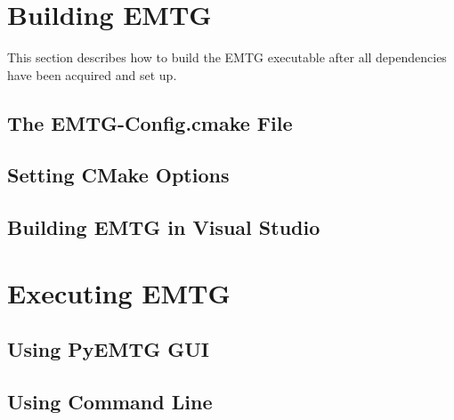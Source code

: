 \documentclass[11pt]{article}
\begin{document}







\section{Building EMTG}
\label{sec:building_emtg}

This section describes how to build the \ac{EMTG} executable after all dependencies have been acquired and set up. 

\subsection{The EMTG-Config.cmake File}
\label{sec:emtg_config}



\subsection{Setting CMake Options}
\label{sec:setting_cmake_options}



\subsection{Building EMTG in Visual Studio}
\label{sec:building_emtg_in_visual_studio}




\section{Executing EMTG}
\label{sec:pyemtg_look_elsewhere}

\subsection{Using PyEMTG GUI}



\subsection{Using Command Line}
\label{sec:executing_emtg_without_pyemtg}




%
%
\end{document}
